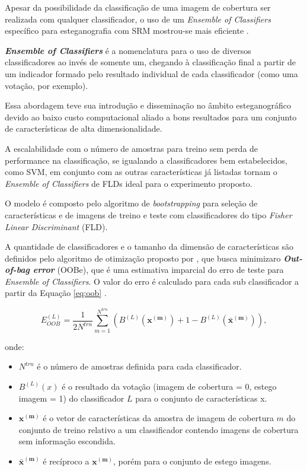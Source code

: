 Apesar da  possibilidade da classificação de uma imagem de cobertura ser realizada com qualquer classificador, o uso de um \textit{Ensemble of Classifiers} específico para esteganografia com SRM mostrou-se mais eficiente \cite{kodovsky2012ensemble}.

\textbf{\textit{Ensemble of Classifiers}} é a nomenclatura para o uso de diversos classificadores ao invés de somente um, chegando à classificação final a partir de um indicador formado pelo resultado individual de cada classificador (como uma votação, por exemplo).

Essa abordagem teve sua introdução e disseminação no âmbito esteganográfico devido ao baixo custo computacional aliado a bons resultados para um conjunto de características de alta dimensionalidade.

A escalabilidade com o número de amostras para treino sem perda de performance na classificação, se igualando a classificadores bem estabelecidos, como SVM, em conjunto com as outras características já listadas tornam o \textit{Ensemble of Classifiers} de FLDs ideal para o experimento proposto.%


O modelo é composto pelo algoritmo de \textit{bootstrapping} para seleção de características e de imagens de treino e teste com classificadores do tipo \textit{Fisher Linear Discriminant} (FLD). 
 
A quantidade de classificadores e o tamanho da dimensão de características são definidos pelo algoritmo de otimização proposto por , que busca minimizaro \textbf{\textit{Out-of-bag error}} (OOBe), que é uma estimativa imparcial do erro de teste para \textit{Ensemble of Classifiers}. O valor do erro é calculado para cada sub classificador a partir da Equação \ref{eq:oob} \cite{fridrich2012rich}.
 
\begin{equation}
  \label{eq:oob}
    E^{(L)}_{OOB} = \frac{1}{2N^{trn}}\sum\limits_{m = 1}^{N^{trn}} (B^{(L)}(\boldsymbol{x^{(m)}}) + 1 - B^{(L)}(\boldsymbol{\bar{x}^{(m)}})),
\end{equation}

onde:

\begin{itemize}
\item $N^{trn}$ é o número de amostras definida para cada classificador.
\item $B^{(L)}(x)$ é o resultado da votação (imagem de cobertura = 0, estego imagem = 1) do classificador $L$ para o conjunto de características x.
\item $\boldsymbol{x^{(m)}}$ é o vetor de características da amostra de imagem de cobertura $m$ do conjunto de treino relativo a um classificador contendo imagens de cobertura sem informação escondida. 
\item $\boldsymbol{\bar{x}^{(m)}}$ é recíproco a $\boldsymbol{x^{(m)}}$, porém para o conjunto de estego imagens. 
\end{itemize}

